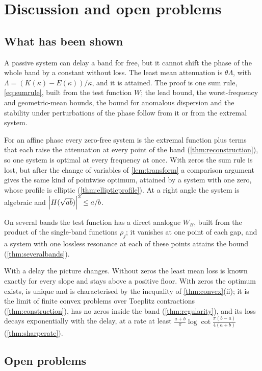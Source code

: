 \section{Discussion and open problems}\label{sec:discussion}

\subsection{What has been shown}

A passive system can delay a band for free, but it cannot shift the phase of
the whole band by a constant without loss. The least mean attenuation is
$\theta\Lambda$, with $\Lambda=(K(\kappa)-E(\kappa))/\kappa$, and it is attained.
The proof is one sum rule, \eqref{eq:sumrule}, built from the test function
$W$; the lead bound, the worst-frequency and geometric-mean bounds, the bound
for anomalous dispersion and the stability under perturbations of the phase
follow from it or from the extremal system.

For an affine phase every zero-free system is the extremal function plus
terms that each raise the attenuation at every point of the band
(\cref{thm:reconstruction}), so one system is optimal at every frequency at
once. With zeros the sum rule is lost, but after the change of variables of
\cref{lem:transform} a comparison argument gives the same kind of pointwise
optimum, attained by a system with one zero, whose profile is elliptic
(\cref{thm:ellipticprofile}). At a right angle the system is algebraic and
$\left|H(\sqrt{ab})\right|^2\le a/b$.

On several bands the test function has a direct analogue $W_B$, built from
the product of the single-band functions $\rho_j$; it vanishes at one point
of each gap, and a system with one lossless resonance at each of these
points attains the bound (\cref{thm:severalbands}).

With a delay the picture changes. Without zeros the least mean loss is
known exactly for every slope and stays above a positive floor. With zeros
the optimum exists, is unique and is characterised by the inequality of
\cref{thm:convex}(ii); it is the limit of finite convex problems over
Toeplitz contractions (\cref{thm:construction}), has no zeros inside the band
(\cref{thm:regularity}), and its loss decays exponentially with the delay,
at a rate at least $\frac{a+b}\pi\log\cot\frac{\pi(b-a)}{4(a+b)}$
(\cref{thm:sharperate}).

\subsection{Open problems}

